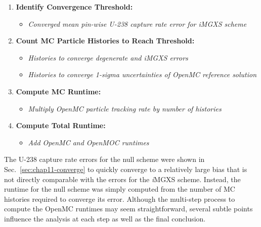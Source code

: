 \vspace{12pt}

\begin{enumerate}[noitemsep,topsep=0pt]
\item \textbf{Identify Convergence Threshold:}
\begin{itemize}[noitemsep,topsep=0pt]
  \item \textit{Converged mean pin-wise U-238 capture rate error for \textit{i}\ac{MGXS} scheme}
\end{itemize}
\item \textbf{Count \ac{MC} Particle Histories to Reach Threshold:} 
\begin{itemize}[noitemsep,topsep=0pt]
  \item \textit{Histories to converge degenerate and \textit{i}\ac{MGXS} errors}
  \item \textit{Histories to converge 1-sigma uncertainties of OpenMC reference solution}
\end{itemize}
\item \textbf{Compute \ac{MC} Runtime:}
\begin{itemize}[noitemsep,topsep=0pt]
  \item \textit{Multiply OpenMC particle tracking rate by number of histories}
\end{itemize}
\item \textbf{Compute Total Runtime:}
\begin{itemize}[noitemsep,topsep=0pt]
  \item \textit{Add OpenMC and OpenMOC runtimes}
\end{itemize}
\end{enumerate}

\vspace{12pt}

\noindent The U-238 capture rate errors for the null scheme were shown in Sec.~\ref{sec:chap11-converge} to quickly converge to a relatively large bias that is not directly comparable with the errors for the \textit{i}\ac{MGXS} scheme. Instead, the runtime for the null scheme was simply computed from the number of \ac{MC} histories required to converge its error. Although the multi-step process to compute the OpenMC runtimes may seem straightforward, several subtle points influence the analysis at each step as well as the final conclusion. 

